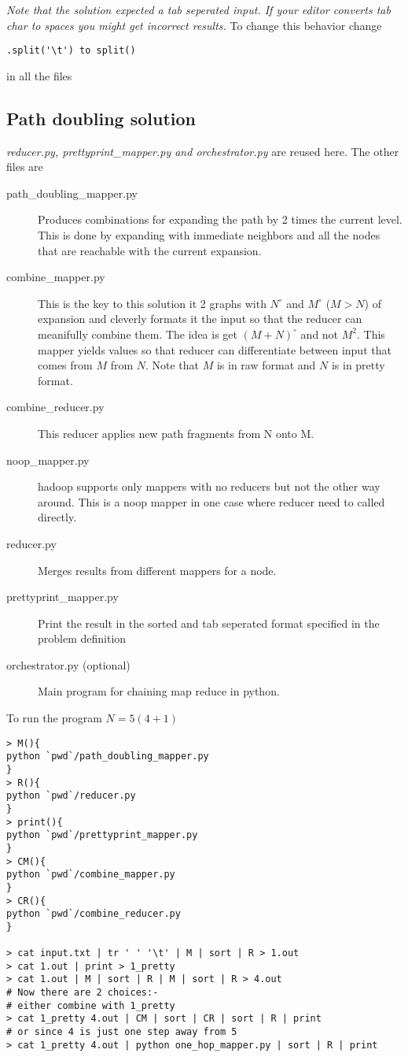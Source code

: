 \documentclass[a4paper]{article}
\begin{document}
\emph{Note that the solution expected a tab seperated input. If your editor converts tab char to spaces you might get incorrect results.} To change this behavior change \begin{verbatim}.split('\t') to split()\end{verbatim}  in all the files

\subsection{Path doubling solution}
\emph{reducer.py, prettyprint\_mapper.py and orchestrator.py} are reused here. The other files are

\begin{description}
    \item[path\_doubling\_mapper.py] Produces combinations for expanding the path by 2 times the current level. This is done by expanding with immediate neighbors and all the nodes that are reachable with the current expansion.
    \item[combine\_mapper.py] This is the key to this solution it 2 graphs with $N^\circ$ and $M^\circ$ ($M>N$) of expansion and cleverly formats it the input so that the reducer can meanifully combine them. The idea is get $(M+N)^\circ$ and not $M^2$. This mapper yields values so that reducer can differentiate between input that comes from $M$ from $N$. Note that $M$ is in raw format and $N$ is in pretty format. 
    \item[combine\_reducer.py] This reducer applies new path fragments from N onto M.
    \item[noop\_mapper.py] hadoop supports only mappers with no reducers but not the other way around. This is a noop mapper in one case where reducer need to called directly.

    \item[reducer.py] Merges results from different mappers for a node.
    \item[prettyprint\_mapper.py] Print the result in the sorted and tab seperated format specified in the problem definition
    \item[orchestrator.py (optional)] Main program for chaining map reduce in python.
\end{description}

To run the program $N=5 (4+1)$ 
\begin{verbatim}
> M(){
python `pwd`/path_doubling_mapper.py
}
> R(){
python `pwd`/reducer.py
}
> print(){
python `pwd`/prettyprint_mapper.py
}
> CM(){
python `pwd`/combine_mapper.py
}
> CR(){
python `pwd`/combine_reducer.py
}

> cat input.txt | tr ' ' '\t' | M | sort | R > 1.out
> cat 1.out | print > 1_pretty  
> cat 1.out | M | sort | R | M | sort | R > 4.out
# Now there are 2 choices:-
# either combine with 1_pretty
> cat 1_pretty 4.out | CM | sort | CR | sort | R | print 
# or since 4 is just one step away from 5
> cat 1_pretty 4.out | python one_hop_mapper.py | sort | R | print 
\end{verbatim}
\end{document}
